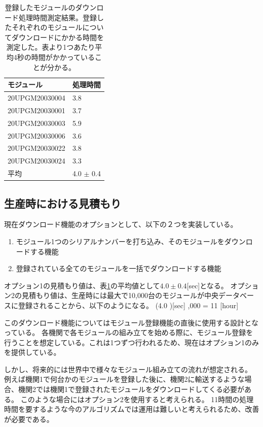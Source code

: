 \begin{table}[tbp]
\begin{center}
\caption[登録したモジュールのダウンロード処理時間測定結果]{登録したモジュールのダウンロード処理時間測定結果。登録したそれぞれのモジュールについてダウンロードにかかる時間を測定した。表より1つあたり平均4秒の時間がかかっていることが分かる。}
\label{download_measurement}
  \begin{tabular}{|ll|} \hline
    モジュール & 処理時間 \\ \hline
    20UPGM20030004 &  3.8 \\ 
    20UPGM20030001 &  3.7 \\ 
    20UPGM20030003 &  5.9 \\ 
    20UPGM20030006 &  3.6 \\ 
    20UPGM20030022 &  3.8 \\ 
    20UPGM20030024 &  3.3 \\ \hline 
    平均           &  4.0 $\pm$ 0.4 \\\hline
  \end{tabular}
\end{center}
\end{table}

\subsection{生産時における見積もり}
現在ダウンロード機能のオプションとして、以下の２つを実装している。
\begin{enumerate}
  \item モジュール1つのシリアルナンバーを打ち込み、そのモジュールをダウンロードする機能
  \item 登録されている全てのモジュールを一括でダウンロードする機能
\end{enumerate}

オプション1の見積もり値は、表\ref{download_measurement}の平均値として$4.0\pm0.4$[sec]となる。
オプション2の見積もり値は、生産時には最大で10,000台のモジュールが中央データベースに登録されることから、以下のようになる。
\bbb
(4.0 )[\rm{sec}] ,000 = 11  [{\rm hour}]
\eee

このダウンロード機能についてはモジュール登録機能の直後に使用する設計となっている。
各機関で各モジュールの組み立てを始める際に、モジュール登録を行うことを想定している。これは1つずつ行われるため、現在はオプション1のみを提供している。

しかし、将来的には世界中で様々なモジュール組み立ての流れが想定される。
例えば機関1で何台かのモジュールを登録した後に、機関2に輸送するような場合、機関2では機関1で登録されたモジュールをダウンロードしてくる必要がある。
このような場合にはオプション2を使用すると考えられる。
11時間の処理時間を要するような今のアルゴリズムでは運用は難しいと考えられるため、改善が必要である。

